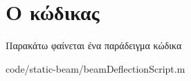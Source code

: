 \chapter{Ο κώδικας }
Παρακάτω φαίνεται ένα παράδειγμα κώδικα


{code/static-beam/beamDeflectionScript.m}


